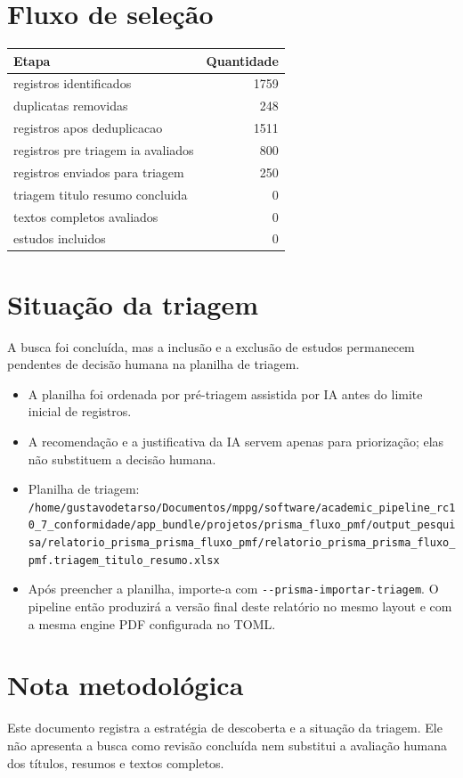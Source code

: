 \documentclass[12pt,a4paper]{article}
\begin{document}
\section{Fluxo de seleção}
\label{sec:orgd13b515}
\begin{center}
\begin{tabular}{lr}
Etapa & Quantidade\\
\hline
registros identificados & 1759\\
duplicatas removidas & 248\\
registros apos deduplicacao & 1511\\
registros pre triagem ia avaliados & 800\\
registros enviados para triagem & 250\\
triagem titulo resumo concluida & 0\\
textos completos avaliados & 0\\
estudos incluidos & 0\\
\end{tabular}
\end{center}

\section{Situação da triagem}
\label{sec:org5efd738}
A busca foi concluída, mas a inclusão e a exclusão de estudos permanecem pendentes de decisão humana na planilha de triagem.
\begin{itemize}
\item A planilha foi ordenada por pré-triagem assistida por IA antes do limite inicial de registros.
\item A recomendação e a justificativa da IA servem apenas para priorização; elas não substituem a decisão humana.
\item Planilha de triagem: \texttt{/home/gustavodetarso/Documentos/mppg/software/academic\_pipeline\_rc10\_7\_conformidade/app\_bundle/projetos/prisma\_fluxo\_pmf/output\_pesquisa/relatorio\_prisma\_prisma\_fluxo\_pmf/relatorio\_prisma\_prisma\_fluxo\_pmf.triagem\_titulo\_resumo.xlsx}
\item Após preencher a planilha, importe-a com \texttt{-{}-prisma-importar-triagem}. O pipeline então produzirá a versão final deste relatório no mesmo layout e com a mesma engine PDF configurada no TOML.
\end{itemize}

\section{Nota metodológica}
\label{sec:org041f757}
Este documento registra a estratégia de descoberta e a situação da triagem. Ele não apresenta a busca como revisão concluída nem substitui a avaliação humana dos títulos, resumos e textos completos.
\end{document}
